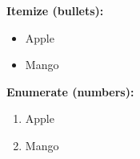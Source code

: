 \documentclass{article}
\begin{document}
	
		
		\textbf{Itemize (bullets):}
		\begin{itemize}
			\item Apple
			\item Mango
		\end{itemize}
		
		\textbf{Enumerate (numbers):}
		\begin{enumerate}
			\item Apple
			\item Mango
		\end{enumerate}
		
	
\end{document}
